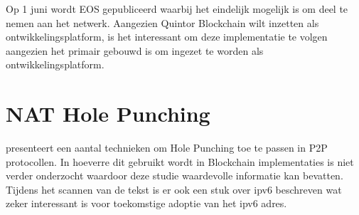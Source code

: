 Op 1 juni wordt EOS gepubliceerd waarbij het eindelijk mogelijk is om deel te nemen aan het netwerk. Aangezien Quintor Blockchain wilt inzetten als ontwikkelingsplatform, is het interessant om deze implementatie te volgen aangezien het primair gebouwd is om ingezet te worden als ontwikkelingsplatform.

\section{\acrfull{NAT} Hole Punching}

\cite{ford2005peer} presenteert een aantal technieken om Hole Punching toe te passen in \acrshort{P2P} protocollen. In hoeverre dit gebruikt wordt in Blockchain implementaties is niet verder onderzocht waardoor deze studie waardevolle informatie kan bevatten. Tijdens het scannen van de tekst is er ook een stuk over \gls{ipv6} beschreven wat zeker interessant is voor toekomstige adoptie van het \gls{ipv6} adres.
